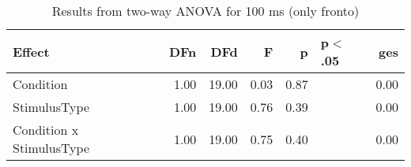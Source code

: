 \begin{table}[ht]
\centering
\begin{tabulary}{\textwidth}{lrrrrlr}
  \toprule
Effect & DFn & DFd & F & p & p$<$.05 & ges \\ 
  \midrule
Condition & 1.00 & 19.00 & 0.03 & 0.87 &  & 0.00 \\ 
  StimulusType & 1.00 & 19.00 & 0.76 & 0.39 &  & 0.00 \\ 
  Condition x StimulusType & 1.00 & 19.00 & 0.75 & 0.40 &  & 0.00 \\ 
   \bottomrule
\end{tabulary}
\caption{Results from two-way ANOVA for 100 ms (only fronto)} 
\end{table}
